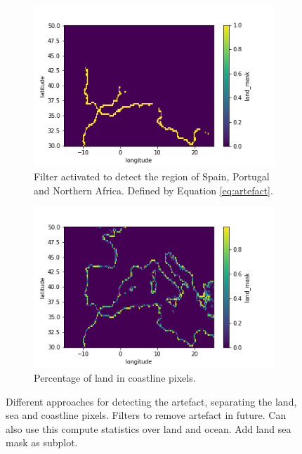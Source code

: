 \begin{figure}[hp]
        \begin{subfigure}[b]{0.475\textwidth}
            \centering
            \includegraphics[scale=0.5]{Chapter4_Results/figurs/restricted_to_artefact.png}
            \caption[Filter activated to detect the region of Spain, Portugal and Northern Africa.]
            {{\small Filter activated to detect the region of Spain, Portugal and Northern Africa. Defined by Equation \eqref{eq:artefact}.}}
            \label{fig:filter_artefact}
        \end{subfigure}
        \hfill
        \begin{subfigure}[b]{0.475\textwidth}  
            \centering 
            \includegraphics[scale=0.5]{Chapter4_Results/figurs/detecting_coast.png}
            \caption[]%
            {{\small Percentage of land in coastline pixels. }}    
            \label{fig:entire_coastline_detected}
        \end{subfigure}

        \caption[Different approaches for detecting the artefact, separating the land, sea and coastline pixels.]
        {\small Different approaches for detecting the artefact, separating the land, sea and coastline pixels. Filters to remove artefact in future. Can also use this compute statistics over land and ocean. Add land sea mask as subplot. }
        \label{fig:filters}
    \end{figure}

